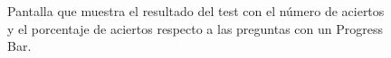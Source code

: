 \begin{figure}[H]%
  \centering
  \qquad
  \caption{Pantalla que muestra el resultado del test con el número de aciertos y el porcentaje de aciertos respecto a las preguntas con un Progress Bar.}%
  \label{fig:example}%
\end{figure}


